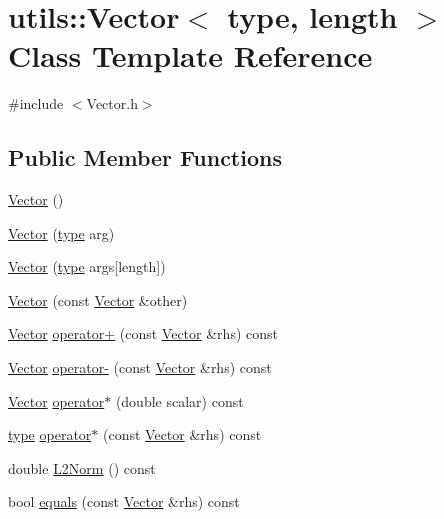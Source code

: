 \hypertarget{classutils_1_1Vector}{\section{utils\-:\-:Vector$<$ type, length $>$ Class Template Reference}
\label{classutils_1_1Vector}
}


{\ttfamily \#include $<$Vector.\-h$>$}

\subsection*{Public Member Functions}
\begin{DoxyCompactItemize}
\item 
\hyperlink{classutils_1_1Vector_a71b42b489a54eb7eae82cff54fae0e12}{Vector} ()
\item 
\hyperlink{classutils_1_1Vector_a5f7d3385f6db28e1376d16e46f1a485f}{Vector} (\hyperlink{classtype}{type} arg)
\item 
\hyperlink{classutils_1_1Vector_a61a6f07c23829b70273ab4578bbb2332}{Vector} (\hyperlink{classtype}{type} args\mbox{[}length\mbox{]})
\item 
\hyperlink{classutils_1_1Vector_abb684db142444c4b19e6cd854db1a0d8}{Vector} (const \hyperlink{classutils_1_1Vector}{Vector} \&other)
\item 
\hyperlink{classutils_1_1Vector}{Vector} \hyperlink{classutils_1_1Vector_aeb0edeaa6b74a48839892e16623b0949}{operator+} (const \hyperlink{classutils_1_1Vector}{Vector} \&rhs) const 
\item 
\hyperlink{classutils_1_1Vector}{Vector} \hyperlink{classutils_1_1Vector_ad6e42a80810a58993f39e1d876eb5716}{operator-\/} (const \hyperlink{classutils_1_1Vector}{Vector} \&rhs) const 
\item 
\hyperlink{classutils_1_1Vector}{Vector} \hyperlink{classutils_1_1Vector_a655ed48c281bfb1c87901313eb1896bb}{operator$\ast$} (double scalar) const 
\item 
\hyperlink{classtype}{type} \hyperlink{classutils_1_1Vector_a306763bbaad613fd2f3387921d2c8698}{operator$\ast$} (const \hyperlink{classutils_1_1Vector}{Vector} \&rhs) const 
\item 
double \hyperlink{classutils_1_1Vector_aa54009b6a76a8059de0eccbe43524d0c}{L2\-Norm} () const 
\item 
bool \hyperlink{classutils_1_1Vector_a761ff3d4c09a533535452b2a20038782}{equals} (const \hyperlink{classutils_1_1Vector}{Vector} \&rhs) const 

\end{DoxyCompactItemize}
